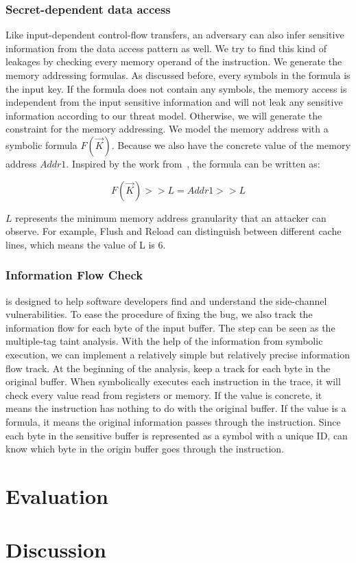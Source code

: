 \subsubsection{Secret-dependent data access}
Like input-dependent control-flow transfers, an adversary can also infer sensitive information from the data access pattern as well. We try to find this kind of leakages by checking every memory operand of the instruction. We generate the memory addressing 
formulas. As discussed before, every symbols in the formula is the input key. If the formula does not contain any symbols, the memory access is independent 
from the input sensitive information and will not leak any sensitive information according to our threat model. Otherwise, we will generate the constraint for
the memory addressing. We model the memory address with a symbolic formula $F(\vec{K})$. Because we also have the concrete value of the memory address $Addr1$. 
Inspired by the work from~\cite{203878}, the formula can be written as:

$$F(\vec{K}) >> L = Addr1 >> L$$

$L$ represents the minimum memory address granularity that an attacker can observe. For example, Flush and Reload can distinguish between different cache lines, which means the value of L is 6.

\subsubsection{Information Flow Check}
\tool{} is designed to help software developers find and understand the side-channel vulnerabilities. To ease the procedure of fixing the bug, we also track the information flow for each byte of the input
buffer. 
The step can be seen as the multiple-tag taint analysis. With the help of the information from symbolic execution, we can implement a relatively simple but relatively precise information flow track.
At the beginning of the analysis, \tool{} keep a track for each byte in 
the original buffer. When \tool{} symbolically executes each instruction in the trace, it will check every value read from registers or memory. If the value is concrete, it means the instruction has nothing to do with the original buffer.
If the value is a formula, it means the original information passes through the instruction. Since each byte in the sensitive buffer is represented as a symbol with a unique ID, \tool{} can know which byte in the origin buffer goes through the instruction.

\section{Evaluation}

\section{Discussion}

